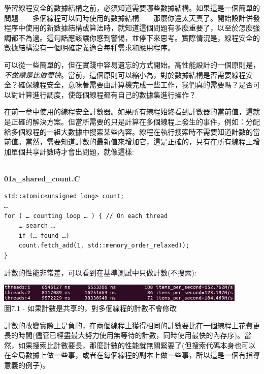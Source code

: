 
學習線程安全的數據結構之前，必須知道需要哪些數據結構。如果這是一個簡單的問題——多個線程可以同時使用的數據結構——那麼你還太天真了。開始設計併發程序中使用的新數據結構或算法時，就知道這個問題有多麼重要了，以至於怎麼強調都不為過。這句話應該讓你感到警惕，並停下來思考。實際情況是，線程安全的數據結構沒有一個明確定義適合每種需求和應用程序。


可以從一些簡單的，但在實踐中容易遺忘的方式開始。高性能設計的一個原則是，\textit{不做總是比做要快}。當前，這個原則可以縮小為，對於數據結構是否需要線程安全？確保線程安全，意味著需要由計算機完成一些工作，我們真的需要嗎？是否可以對計算進行調度，使每個線程都有自己的數據集進行操作？

在前一章中使用的線程安全計數器。如果所有線程始終看到計數器的當前值，這就是正確的解決方案。但當所需要的只是計算在多個線程上發生的事件，例如：分配給多個線程的一組大數據中搜索某些內容。線程在執行搜索時不需要知道計數的當前值。當然，需要知道計數的最新值來增加它，這是正確的，只有在所有線程上增加單個共享計數時才會出問題，就像這樣:

\hspace*{\fill} \\ %
\noindent
\textbf{01a\_shared\_count.C}
\begin{lstlisting}[style=styleCXX]
std::atomic<unsigned long> count;
…
for ( … counting loop … ) { // On each thread
	… search …
	if (… found …)
	count.fetch_add(1, std::memory_order_relaxed));
}
\end{lstlisting}

計數的性能非常差，可以看到在基準測試中只做計數(不搜索):

\begin{center}
\includegraphics[width=0.9\textwidth]{content/2/chapter7/images/1.jpg}\\
圖7.1 - 如果計數是共享的，對多個線程的計數不會修改
\end{center}

計數的改變實際上是負的，在兩個線程上獲得相同的計數要比在一個線程上花費更長的時間(儘管已經盡最大努力使用無等待的計數，同時使用最快的內存序)。當然，如果搜索比計數要長，那麼計數的性能就無關緊要了(但搜索代碼本身也可以在全局數據上做一些事，或者在每個線程的副本上做一些事，所以這是一個有指導意義的例子)。

